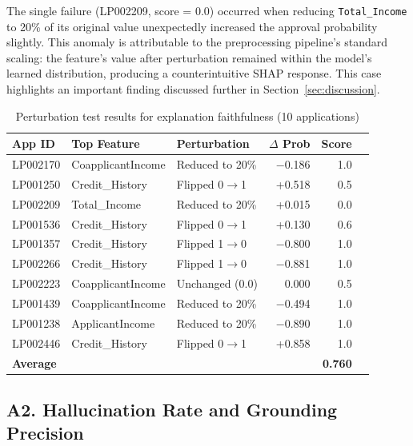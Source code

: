 \documentclass[lnbip]{svmultln}
\begin{document}
The single failure (LP002209, score = 0.0) occurred when reducing \texttt{Total\_Income} to 20\% of its original value unexpectedly increased the approval probability slightly. This anomaly is attributable to the preprocessing pipeline's standard scaling: the feature's value after perturbation remained within the model's learned distribution, producing a counterintuitive SHAP response. This case highlights an important finding discussed further in Section~\ref{sec:discussion}.

\begin{table}[htp]
    \centering
    \caption{Perturbation test results for explanation faithfulness (10 applications)}
    \label{tab:faithfulness}
    \begin{tabular}{l l l r r r}
        \toprule
        \textbf{App ID} & \textbf{Top Feature} & \textbf{Perturbation} & \textbf{$\Delta$ Prob} & \textbf{Score} \\
        \midrule
        LP002170 & CoapplicantIncome & Reduced to 20\% & $-$0.186 & 1.0 \\
        LP001250 & Credit\_History & Flipped 0$\to$1 & +0.518 & 0.5 \\
        LP002209 & Total\_Income & Reduced to 20\% & +0.015 & 0.0 \\
        LP001536 & Credit\_History & Flipped 0$\to$1 & +0.130 & 0.6 \\
        LP001357 & Credit\_History & Flipped 1$\to$0 & $-$0.800 & 1.0 \\
        LP002266 & Credit\_History & Flipped 1$\to$0 & $-$0.881 & 1.0 \\
        LP002223 & CoapplicantIncome & Unchanged (0.0) & 0.000 & 0.5 \\
        LP001439 & CoapplicantIncome & Reduced to 20\% & $-$0.494 & 1.0 \\
        LP001238 & ApplicantIncome & Reduced to 20\% & $-$0.890 & 1.0 \\
        LP002446 & Credit\_History & Flipped 0$\to$1 & +0.858 & 1.0 \\
        \midrule
        \multicolumn{4}{l}{\textbf{Average}} & \textbf{0.760} \\
        \bottomrule
    \end{tabular}
\end{table}


\subsection{A2. Hallucination Rate and Grounding Precision}
\end{document}
